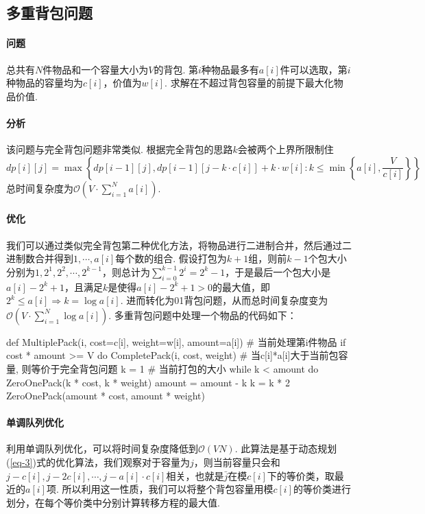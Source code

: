 \documentclass[12pt, a4paper, oneside]{ctexart}
\numberwithin{equation}{section}  %
\let\leq=\leqslant %
\def\O{\mathcal{O}}         %
\begin{document}
\subsection{多重背包问题}
\paragraph*{问题}总共有$N$件物品和一个容量大小为$V$的背包. 第$i$种物品最多有$a[i]$件可以选取，第$i$种物品的容量均为$c[i]$，价值为$w[i]$. 求解在不超过背包容量的前提下最大化物品价值.
\paragraph*{分析}该问题与完全背包问题非常类似. 根据完全背包的思路$k$会被两个上界所限制住
\begin{equation}\label{eq-3}
    dp[i][j] = \max\left\{dp[i-1][j], dp[i-1][j-k\cdot c[i]]+k\cdot w[i]: k\leq \min\left\{a[i],\frac{V}{c[i]}\right\}\right\}
\end{equation}
总时间复杂度为$\O(V\cdot \sum_{i=1}^Na[i])$.

\paragraph*{优化}我们可以通过类似完全背包第二种优化方法，将物品进行二进制合并，然后通过二进制数合并得到$1,\cdots, a[i]$每个数的组合. 假设打包为$k+1$组，则前$k-1$个包大小分别为$1,2^1,2^2,\cdots, 2^{k-1}$，则总计为$\sum_{i=0}^{k-1}2^i = 2^k-1$，于是最后一个包大小是$a[i] - 2^k+1$，且满足$k$是使得$a[i]-2^k+1 > 0$的最大值，即$2^k\leq a[i]\Rightarrow k = \log a[i]$. 进而转化为01背包问题，从而总时间复杂度变为$\O(V\cdot \sum_{i=1}^N\log a[i])$. 多重背包问题中处理一个物品的代码如下：
\begin{pythoncode}
def MultiplePack(i, cost=c[i], weight=w[i], amount=a[i])  # 当前处理第i件物品
    if cost * amount >= V do
        CompletePack(i, cost, weight)  # 当c[i]*a[i]大于当前包容量, 则等价于完全背包问题
    k = 1  # 当前打包的大小
    while k < amount do
        ZeroOnePack(k * cost, k * weight)
        amount = amount - k
        k = k * 2
    ZeroOnePack(amount * cost, amount * weight)
\end{pythoncode}
\paragraph*{单调队列优化}利用单调队列优化，可以将时间复杂度降低到$\O(VN)$. 此算法是基于动态规划(\ref{eq-3})式的优化算法，我们观察对于容量为$j$，则当前容量只会和$j-c[i],j-2c[i],\cdots, j-a[i]\cdot c[i]$相关，也就是$\bar{j}$在模$c[i]$下的等价类，取最近的$a[i]$项. 所以利用这一性质，我们可以将整个背包容量用模$c[i]$的等价类进行划分，在每个等价类中分别计算转移方程的最大值.
\end{document}
